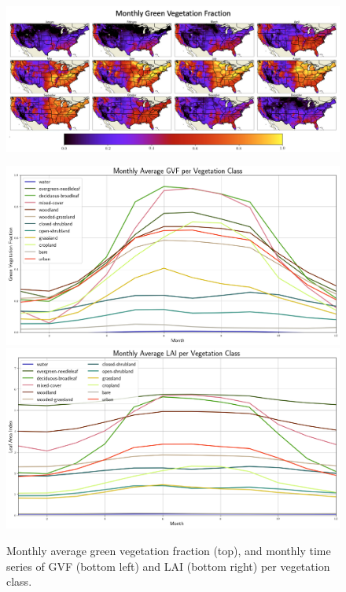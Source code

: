 \begin{figure}[h!]
    \centering

    \includegraphics[width=.98\linewidth,draft=false]{figures/gvf/gvf_mosaic.png}

    \includegraphics[width=.48\linewidth,draft=false]{figures/gvf/gvf_monthly_stats.png}
    \includegraphics[width=.48\linewidth,draft=false]{figures/gvf/lai_monthly_stats.png}
    \caption{Monthly average green vegetation fraction (top), and monthly time series of GVF (bottom left) and LAI (bottom right) per vegetation class.}
    \label{gs-vegetation}
\end{figure}


